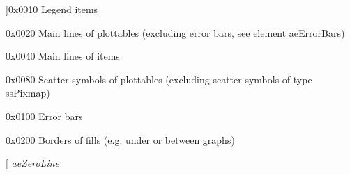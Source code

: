 \begin{Desc}
\begin{description}
{}]{\ttfamily 0x0010} Legend items \item[{\em 
\hypertarget{namespace_q_c_p_ae55dbe315d41fe80f29ba88100843a0ca4145e4251b0cf2dbedabeea0a38f84f6}{}ae\+Plottables\label{namespace_q_c_p_ae55dbe315d41fe80f29ba88100843a0ca4145e4251b0cf2dbedabeea0a38f84f6}
}]{\ttfamily 0x0020} Main lines of plottables (excluding error bars, see element \hyperlink{namespace_q_c_p_ae55dbe315d41fe80f29ba88100843a0ca9dcf3882cb321bb305f71fdc0f09f63d}{ae\+Error\+Bars}) \item[{\em 
\hypertarget{namespace_q_c_p_ae55dbe315d41fe80f29ba88100843a0caf7712a85d6b0c75b24301d2fe9484db3}{}ae\+Items\label{namespace_q_c_p_ae55dbe315d41fe80f29ba88100843a0caf7712a85d6b0c75b24301d2fe9484db3}
}]{\ttfamily 0x0040} Main lines of items \item[{\em 
\hypertarget{namespace_q_c_p_ae55dbe315d41fe80f29ba88100843a0cae45ed8cd167bffe27d7f40da4bc17e9c}{}ae\+Scatters\label{namespace_q_c_p_ae55dbe315d41fe80f29ba88100843a0cae45ed8cd167bffe27d7f40da4bc17e9c}
}]{\ttfamily 0x0080} Scatter symbols of plottables (excluding scatter symbols of type ss\+Pixmap) \item[{\em 
\hypertarget{namespace_q_c_p_ae55dbe315d41fe80f29ba88100843a0ca9dcf3882cb321bb305f71fdc0f09f63d}{}ae\+Error\+Bars\label{namespace_q_c_p_ae55dbe315d41fe80f29ba88100843a0ca9dcf3882cb321bb305f71fdc0f09f63d}
}]{\ttfamily 0x0100} Error bars \item[{\em 
\hypertarget{namespace_q_c_p_ae55dbe315d41fe80f29ba88100843a0ca788810f0aa930137de6ad6cc6d83d354}{}ae\+Fills\label{namespace_q_c_p_ae55dbe315d41fe80f29ba88100843a0ca788810f0aa930137de6ad6cc6d83d354}
}]{\ttfamily 0x0200} Borders of fills (e.\+g. under or between graphs) \item[{\em 
\hypertarget{namespace_q_c_p_ae55dbe315d41fe80f29ba88100843a0ca261f8ea78cf3c9561726223ffa33dc12}{}ae\+Zero\+Line\label{namespace_q_c_p_ae55dbe315d41fe80f29ba88100843a0ca261f8ea78cf3c9561726223ffa33dc12}
}
\end{description}
\end{Desc}
